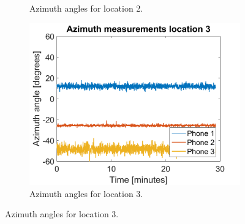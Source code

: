 \documentclass[a4paper, notitlepage]{report}
\begin{document}
\begin{figure}[H]
\begin{adjustwidth}{-1in}{-1in}
\begin{subfigure}{0.33\textwidth}
		\caption{Azimuth angles for location 2.}
		\label{app:orientation_az_loc2}
	\end{subfigure}
	\begin{subfigure}{0.33\textwidth}
		\includegraphics[width=\textwidth]{figures/orientation/az_loc3}
		\caption{Azimuth angles for location 3.}
		\label{app:orientation_az_loc3}
	\end{subfigure}
	

\end{adjustwidth}
\end{figure}
\end{document}

